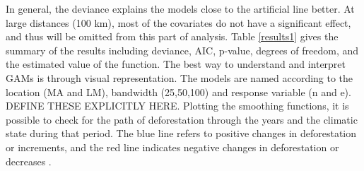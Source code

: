 In general, the deviance explains the models close to the artificial line better. At large distances (100 km), most of the covariates do not have a significant effect, and thus will be omitted from this part of analysis. Table \ref{results1} gives the summary of the results including deviance, AIC, p-value, degrees of freedom, and the estimated value of the function. The best way to understand and interpret GAMs is through visual representation. The models are named according to the location (MA and LM), bandwidth (25,50,100) and response variable (n and e). DEFINE THESE EXPLICITLY HERE.  Plotting the smoothing functions, it is possible to check for the path of deforestation through the years and the climatic state during that period. The blue line refers to positive changes in deforestation or increments, and the red line indicates negative changes in deforestation or decreases \citep{Gavin_2018}. 


